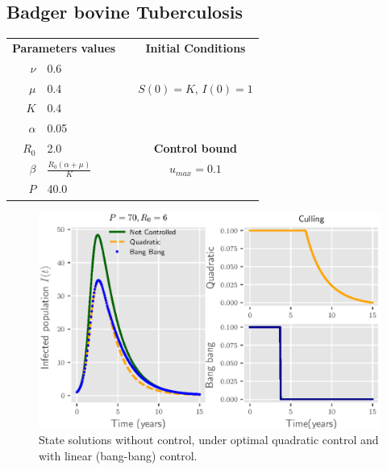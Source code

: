 \subsection*{Badger bovine Tuberculosis}
\begin{table}[H]
  \begin{center}
    \begin{tabular}{@{}rllc@{}}
      \toprule
      \multicolumn{2}{c}{\textbf{Parameters values}}
      &&
      \textbf{Initial Conditions}
      \\
      \cmidrule{1-2}
      \cmidrule{4-4}
      $\nu$
        & \num{0.6}
      \\
      $\mu$
        & \num{0.4}
        &&  
          $S(0) = K$, 
          $I(0) = 1$
      \\
      $K$
        & \num{0.4}
      \\
      $\alpha$
        & \num{0.05}
      \\
      $R_0$
        & \num{2.0}
        && 
          \textbf{Control bound}
      \\
      \cmidrule{4-4}
      $\beta$
        &
         $
          \displaystyle
          \frac{R_0(\alpha + \mu)}{K}
         $
        &&
          $u_{max} = \num{0.1}$
      \\
      $P$
        & \num{40.0}
      \\
      \bottomrule
    \end{tabular}
  \end{center}
\end{table}

\begin{figure}[H]
  \centering
  \includegraphics{Figures/figure_1_culling}
  \caption{State solutions without control, under optimal quadratic control 
  and with linear (bang-bang) control.}
  \label{fig:figure1culling}
\end{figure}

